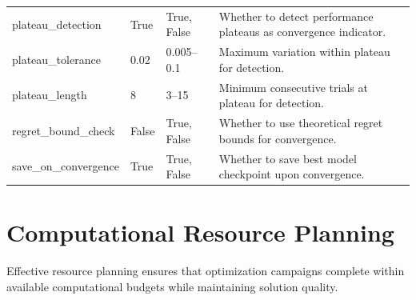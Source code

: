\begin{longtable}{p{3.5cm}p{2cm}p{2.5cm}p{5.5cm}}
\addlinespace
plateau\_detection & True & True, False & Whether to detect performance plateaus as convergence indicator. \\
\addlinespace
plateau\_tolerance & 0.02 & 0.005--0.1 & Maximum variation within plateau for detection. \\
\addlinespace
plateau\_length & 8 & 3--15 & Minimum consecutive trials at plateau for detection. \\
\addlinespace
regret\_bound\_check & False & True, False & Whether to use theoretical regret bounds for convergence. \\
\addlinespace
save\_on\_convergence & True & True, False & Whether to save best model checkpoint upon convergence. \\
\end{longtable}

\section{Computational Resource Planning}
\label{sec:resource_planning}

Effective resource planning ensures that optimization campaigns complete within available computational budgets while maintaining solution quality.

